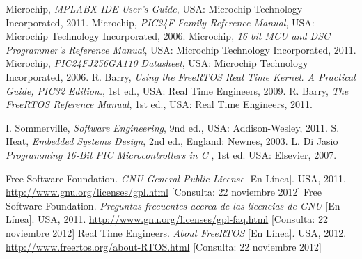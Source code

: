 \documentclass[11pt,letterpaper]{article}
\begin{document}
\newpage
\begin{thebibliography}{50}
	 Microchip, \textit{MPLABX IDE User's Guide}, USA:  Microchip Technology Incorporated, 2011.
	 Microchip, \textit{PIC24F Family Reference Manual}, USA:  Microchip Technology Incorporated, 2006.
	 Microchip, \textit{16 bit MCU and DSC Programmer's Reference Manual}, USA:  Microchip Technology Incorporated, 2011.
	 Microchip, \textit{PIC24FJ256GA110 Datasheet}, USA:  Microchip Technology Incorporated, 2006.
	 R. Barry, \textit{Using the FreeRTOS Real Time Kernel. A Practical Guide, PIC32 Edition.}, 1st ed., USA: Real Time Engineers, 2009.
	 R. Barry, \textit{The FreeRTOS Reference Manual}, 1st ed., USA: Real Time Engineers, 2011.

	 I. Sommerville, \textit{Software Engineering}, 9nd ed., USA: Addison-Wesley, 2011.
	 S. Heat, \textit{Embedded Systems Design}, 2nd ed., England: Newnes, 2003.
	 L. Di Jasio \textit{Programming 16-Bit PIC Microcontrollers in C} , 1st ed. USA: Elsevier, 2007.
	
	 Free Software Foundation. \textit{GNU General Public License} [En Línea]. USA, 2011. \url{http://www.gnu.org/licenses/gpl.html} [Consulta: 22 noviembre 2012]
	 Free Software Foundation. \textit{Preguntas frecuentes acerca de las licencias de GNU} [En Línea]. USA, 2011. \url{http://www.gnu.org/licenses/gpl-faq.html} [Consulta: 22 noviembre 2012]
	 Real Time Engineers. \textit{About FreeRTOS} [En Línea]. USA, 2012. \url{http://www.freertos.org/about-RTOS.html} [Consulta: 22 noviembre 2012]
	
\end{thebibliography}
\end{document}
